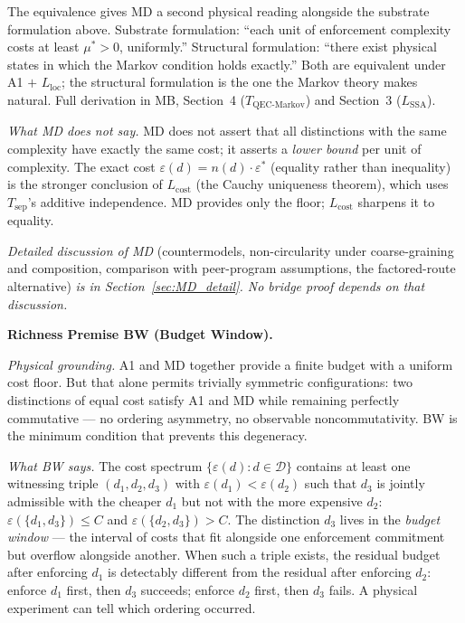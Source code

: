 \documentclass[11pt]{article}
\theoremstyle{remark}
\begin{document}
The equivalence gives MD a second physical reading alongside the substrate
formulation above.  Substrate formulation: ``each unit of enforcement complexity
costs at least $\mu^* > 0$, uniformly.''  Structural formulation: ``there exist
physical states in which the Markov condition holds exactly.''  Both are equivalent
under A1 $+$ $L_{\mathrm{loc}}$; the structural formulation is the one the Markov
theory makes natural.  Full derivation in MB, Section~4 ($T_{\mathrm{QEC\text{-}Markov}}$) and Section~3 ($L_{\mathrm{SSA}}$).

\smallskip\noindent\textit{What MD does not say.}  MD does not assert that all distinctions with the same complexity have exactly the same cost; it asserts a \emph{lower bound} per unit of complexity.  The exact cost $\varepsilon(d) = n(d) \cdot \varepsilon^*$ (equality rather than inequality) is the stronger conclusion of $L_{\mathrm{cost}}$ (the Cauchy uniqueness theorem), which uses $T_{\mathrm{sep}}$'s additive independence.  MD provides only the floor; $L_{\mathrm{cost}}$ sharpens it to equality.

\smallskip\noindent\textit{Detailed discussion of MD} (countermodels, non-circularity under coarse-graining and composition, comparison with peer-program assumptions, the factored-route alternative) \textit{is in Section~\ref{sec:MD_detail}.  No bridge proof depends on that discussion.}

\smallskip\noindent\textbf{Richness Premise BW (Budget Window).}

\textit{Physical grounding.}  A1 and MD together provide a finite budget with a uniform cost floor.  But that alone permits trivially symmetric configurations: two distinctions of equal cost satisfy A1 and MD while remaining perfectly commutative --- no ordering asymmetry, no observable noncommutativity.  BW is the minimum condition that prevents this degeneracy.

\smallskip\noindent\textit{What BW says.}  The cost spectrum $\{\varepsilon(d) : d \in \mathcal{D}\}$ contains at least one witnessing triple $(d_1, d_2, d_3)$ with $\varepsilon(d_1) < \varepsilon(d_2)$ such that $d_3$ is jointly admissible with the cheaper $d_1$ but not with the more expensive $d_2$: $\varepsilon(\{d_1,d_3\}) \le C$ and $\varepsilon(\{d_2,d_3\}) > C$.  The distinction $d_3$ lives in the \emph{budget window} --- the interval of costs that fit alongside one enforcement commitment but overflow alongside another.  When such a triple exists, the residual budget after enforcing $d_1$ is detectably different from the residual after enforcing $d_2$: enforce $d_1$ first, then $d_3$ succeeds; enforce $d_2$ first, then $d_3$ fails.  A physical experiment can tell which ordering occurred.
\end{document}
